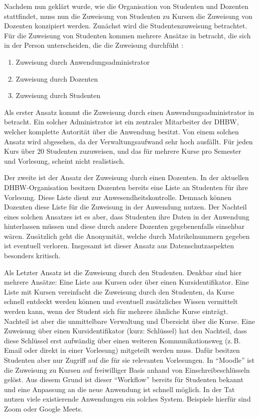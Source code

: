 Nachdem nun geklärt wurde, wie die Organisation von Studenten und Dozenten stattfindet, muss nun die Zuweisung von Studenten zu Kursen die Zuweisung von Dozenten konzipiert werden.
Zunächst wird die Studentenzuweisung betrachtet.
Für die Zuweisung von Studenten kommen mehrere Ansätze in betracht, die sich in der Person unterscheiden, die die Zuweisung durchfüht :
\begin{enumerate}
    \item Zuweisung durch Anwendungsadministrator
    \item Zuweisung durch Dozenten
    \item Zuweisung durch Studenten
\end{enumerate}
Als erster Ansatz kommt die Zuweisung durch einen Anwendungsadministrator in betracht.
Ein solcher Administrator ist ein zentraler Mitarbeiter der DHBW, welcher komplette Autorität über die Anwendung besitzt.
Von einem solchen Ansatz wird abgesehen, da der Verwaltungsaufwand sehr hoch ausfällt.
Für jeden Kurs über 20 Studenten zuzuweisen, und das für mehrere Kurse pro Semester und Vorlesung, scheint nicht realistisch.

Der zweite ist der Ansatz der Zuweisung durch einen Dozenten.
In der aktuellen DHBW-Organisation besitzen Dozenten bereits eine Liste an Studenten für ihre Vorlesung.
Diese Liste dient zur Anwesendheitskontrolle.
Demnach können Dozenten diese Liste für die Zuweisung in der Anwendung nutzen.
Der Nachteil eines solchen Ansatzes ist es aber, dass Studenten ihre Daten in der Anwendung hinterlassen müssen und diese durch andere Dozenten gegebenenfalls einsehbar wären.
Zusätzlich geht die Anonymität, welche durch Matrikelnummern gegeben ist eventuell verloren.
Insgesamt ist dieser Ansatz aus Datenschutzaspekten besonders kritisch. %

Als Letzter Ansatz ist die Zuweisung durch den Studenten.
Denkbar sind hier mehrere Ansätze: Eine Liste aus Kursen oder über einen Kursidentifikator.
Eine Liste mit Kursen vereinfacht die Zuweisung durch den Studenten, da Kurse schnell entdeckt werden können und eventuell zusätzliches Wissen vermittelt werden kann, wenn der Student sich für mehrere ähnliche Kurse einträgt.
Nachteil ist aber die unmittelbare Verwaltung und Übersicht über die Kurse.
Eine Zuweisung über einen Kursidentifikator (kurz: Schlüssel) hat den Nachteil, dass diese Schlüssel erst aufwändig über einen weiteren Kommunikationsweg (z.\,B. Email oder direkt in einer Vorlesung) mitgeteilt werden muss.
Dafür besitzen Studenten aber nur Zugriff auf die für sie relevanten Vorlesungen.
In \enquote{Moodle} ist die Zuweisung zu Kursen auf freiwilliger Basis anhand von Einschreibeschlüsseln gelöst.
Aus diesem Grund ist dieser \enquote{Workflow} bereits für Studenten bekannt und eine Anpassung an die neue Anwendung ist schnell möglich.
In der Tat nutzen viele existierende Anwendungen ein solches System.
Beispiele hierfür sind Zoom oder Google Meets.






